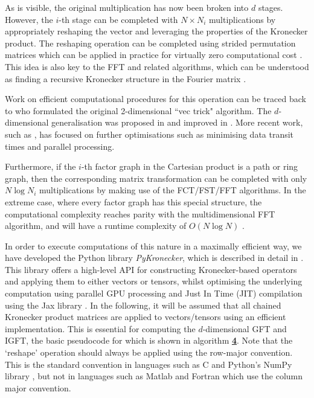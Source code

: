 As is visible, the original multiplication has now been broken into $d$ stages. However, the $i$-th stage can be completed with $N \times N_i$ multiplications by appropriately reshaping the vector and leveraging the properties of the Kronecker product. The reshaping operation can be completed using strided permutation matrices which can be applied in practice for virtually zero computational cost \citep{Granata1992}. This idea is also key to the FFT and related algorithms, which can be understood as finding a recursive Kronecker structure in the Fourier matrix \citep{Tolimieri2013}. 

Work on efficient computational procedures for this operation can be traced back to \cite{Roth1934} who formulated the original 2-dimensional ``vec trick" algorithm. The $d$-dimensional generalisation was proposed in \cite{Pereyra1973} and improved in \cite{DeBoor1979}. More recent work, such as \cite{Fackler2019}, has focused on further optimisations such as minimising data transit times and parallel processing. 

Furthermore, if the $i$-th factor graph in the Cartesian product is a path or ring graph, then the corresponding matrix transformation can be completed with only $N \log N_i$ multiplications by making use of the FCT/FST/FFT algorithms. In the extreme case, where every factor graph has this special structure, the computational complexity reaches parity with the multidimensional FFT algorithm, and will have a runtime complexity of $O(N \log N)$ \citep{Smith1995}. 

In order to execute computations of this nature in a maximally efficient way, we have developed the Python library \textit{PyKronecker}, which is described in detail in \cite{Antonian2023}. This library offers a high-level API for constructing Kronecker-based operators and applying them to either vectors or tensors, whilst optimising the underlying computation using parallel GPU processing and Just In Time (JIT) compilation using the Jax library \citep{Bradbury2018}. In the following, it will be assumed that all chained Kronecker product matrices are applied to vectors/tensors using an efficient implementation. This is essential for computing the $d$-dimensional GFT and IGFT, the basic pseudocode for which is shown in algorithm \hyperlink{al:GFT_dd}{\textbf{4}}. Note that the `reshape' operation should always be applied using the row-major convention. This is the standard convention in languages such as C and Python's NumPy library \citep{Harris2020}, but not in languages such as Matlab and Fortran which use the column major convention. 


